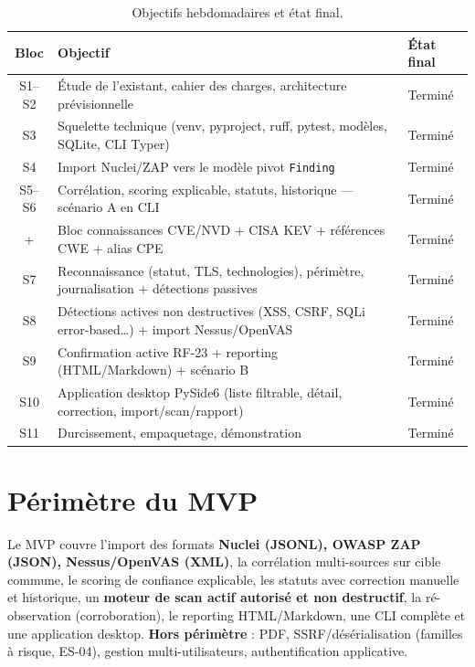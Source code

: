 \documentclass[11pt,a4paper]{report}
\newcommand{\code}[1]{\texttt{#1}}
\begin{document}
\begin{table}[h!]
\centering
\small
\begin{tabular}{@{}cp{9.8cm}p{3.2cm}@{}}
\toprule
\textbf{Bloc} & \textbf{Objectif} & \textbf{État final} \\
\midrule
S1--S2 & Étude de l'existant, cahier des charges, architecture prévisionnelle & Terminé \\
S3 & Squelette technique (venv, pyproject, ruff, pytest, modèles, SQLite, CLI Typer) & Terminé \\
S4 & Import Nuclei/ZAP vers le modèle pivot \code{Finding} & Terminé \\
S5--S6 & Corrélation, scoring explicable, statuts, historique --- scénario A en CLI & Terminé \\
+ & Bloc connaissances CVE/NVD + CISA KEV + références CWE + alias CPE & Terminé \\
S7 & Reconnaissance (statut, TLS, technologies), périmètre, journalisation + détections passives & Terminé \\
S8 & Détections actives non destructives (XSS, CSRF, SQLi error-based\ldots) + import Nessus/OpenVAS & Terminé \\
S9 & Confirmation active RF-23 + reporting (HTML/Markdown) + scénario B & Terminé \\
S10 & Application desktop PySide6 (liste filtrable, détail, correction, import/scan/rapport) & Terminé \\
S11 & Durcissement, empaquetage, démonstration & Terminé \\
\bottomrule
\end{tabular}
\caption{Objectifs hebdomadaires et état final.}
\end{table}

\section{Périmètre du MVP}

Le MVP couvre l'import des formats \textbf{Nuclei (JSONL), OWASP ZAP (JSON),
Nessus/OpenVAS (XML)}, la corrélation multi-sources sur cible commune, le scoring de
confiance explicable, les statuts avec correction manuelle et historique, un \textbf{moteur
de scan actif autorisé et non destructif}, la ré-observation (corroboration), le reporting
HTML/Markdown, une CLI complète et une application desktop. \textbf{Hors périmètre} : PDF,
SSRF/désérialisation (familles à risque, ES-04), gestion multi-utilisateurs,
authentification applicative.
\end{document}
